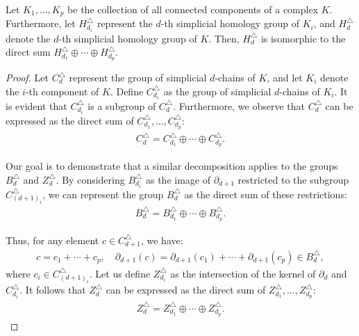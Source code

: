\begin{proposition}{\cite[Proposition 2.6]{hatcher2005algebraic}}
	Let \( K_{1}, \ldots, K_{p} \) be the collection of all connected components of a complex \( K \). Furthermore, let \( H^{\triangle}_{d_i} \) represent the \( d \)-th simplicial homology group of \( K_{i} \), and \( H^{\triangle}_{d} \) denote the \( d \)-th simplicial homology group of \( K \). Then, \( H^{\triangle}_{d} \) is isomorphic to the direct sum \( H^{\triangle}_{d_1} \oplus \cdots \oplus H^{\triangle}_{d_p} \).
\end{proposition}

\begin{proof}
	Let \( C^{\triangle}_{d} \) represent the group of simplicial \( d \)-chains of \( K \), and let \( K_{i} \) denote the \( i \)-th component of \( K \). Define \( C^{\triangle}_{d_i} \) as the group of simplicial \( d \)-chains of \( K_{i} \). It is evident that \( C^{\triangle}_{d_i} \) is a subgroup of \( C^{\triangle}_{d} \). Furthermore, we observe that \( C^{\triangle}_{d} \) can be expressed as the direct sum of \( C^{\triangle}_{d_1}, \ldots, C^{\triangle}_{d_p} \):
	\begin{align}
		C^{\triangle}_{d} = C^{\triangle}_{d_1} \oplus \cdots \oplus C^{\triangle}_{d_p}. 
	\end{align}
				
	Our goal is to demonstrate that a similar decomposition applies to the groups \( B^{\triangle}_{d} \) and \( Z^{\triangle}_{d} \). By considering \( B^{\triangle}_{d_i} \) as the image of \( \partial_{d+1} \) restricted to the subgroup \( C^{\triangle}_{{(d+1)}_i} \), we can represent the group \( B^{\triangle}_{d} \) as the direct sum of these restrictions:
	\begin{align}
		B^{\triangle}_{d} = B^{\triangle}_{d_1} \oplus \cdots \oplus B^{\triangle}_{d_p}. 
	\end{align}
				
	Thus, for any element \( c \in C^{\triangle}_{d+1} \), we have:
	\begin{align}
		c = c_{1} + \cdots + c_{p}, \quad \partial_{d+1}(c) = \partial_{d+1}(c_{1}) + \cdots + \partial_{d+1}(c_{p}) \in B^{\triangle}_{d}, 
	\end{align}
	where \( c_{i} \in C^{\triangle}_{(d+1)_i} \). Let us define \( Z^{\triangle}_{d_i} \) as the intersection of the kernel of \( \partial_{d} \) and \( C^{\triangle}_{d_i} \). It follows that \( Z^{\triangle}_{d} \) can be expressed as the direct sum of \( Z^{\triangle}_{d_1}, \ldots, Z^{\triangle}_{d_p} \):
	\begin{align}
		Z^{\triangle}_{d} = Z^{\triangle}_{d_1} \oplus \cdots \oplus Z^{\triangle}_{d_p}. 
	\end{align}
				

\end{proof}
